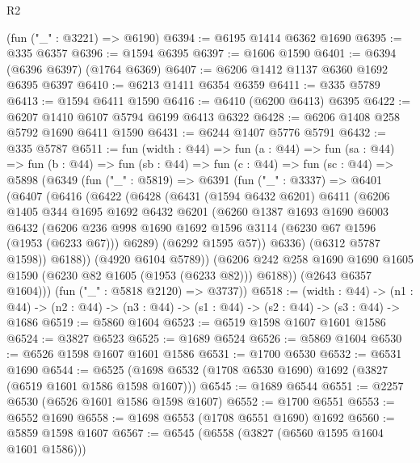 \begin{lexlean}{R2}
\begin{coremodule}
    (fun ("_" : @3221) => @6190)
@6394 := @6195 @1414 @6362 @1690
@6395 := @335 @6357
@6396 := @1594 @6395
@6397 := @1606 @1590
@6401 := @6394 (@6396 @6397) (@1764 @6369)
@6407 := @6206 @1412 @1137 @6360 @1692 @6395 @6397
@6410 := @6213 @1411 @6354 @6359
@6411 := @335 @5789
@6413 := @1594 @6411 @1590
@6416 := @6410 (@6200 @6413) @6395
@6422 := @6207 @1410 @6107 @5794 @6199 @6413 @6322
@6428 := @6206 @1408 @258 @5792 @1690 @6411 @1590
@6431 := @6244 @1407 @5776 @5791
@6432 := @335 @5787
@6511 := fun (width : @44) =>
  fun (a : @44) =>
  fun (sa : @44) =>
  fun (b : @44) =>
  fun (sb : @44) =>
  fun (c : @44) =>
  fun (sc : @44) =>
  @5898
    (@6349
      (fun ("_" : @5819) =>
      @6391
        (fun ("_" : @3337) =>
        @6401
          (@6407
            (@6416
              (@6422
                (@6428
                  (@6431
                    (@1594 @6432 @6201)
                    @6411
                    (@6206
                      @1405
                      @344
                      @1695
                      @1692
                      @6432
                      @6201
                      (@6260
                        @1387
                        @1693
                        @1690
                        @6003
                        @6432
                        (@6206
                          @236
                          @998
                          @1690
                          @1692
                          @1596
                          @3114
                          (@6230 @67 @1596 (@1953 (@6233 @67)))
                          @6289)
                        (@6292 @1595 @57))
                      @6336)
                    (@6312 @5787 @1598))
                  @6188))
              (@4920 @6104 @5789))
            (@6206 @242 @258 @1690 @1690 @1605 @1590 (@6230 @82 @1605 (@1953 (@6233 @82))) @6188))
          (@2643 @6357 @1604)))
      (fun ("_" : @5818 @2120) => @3737))
@6518 := (width : @44) ->
  (n1 : @44) -> (n2 : @44) -> (n3 : @44) -> (s1 : @44) -> (s2 : @44) -> (s3 : @44) -> @1686
@6519 := @5860 @1604
@6523 := @6519 @1598 @1607 @1601 @1586
@6524 := @3827 @6523
@6525 := @1689 @6524
@6526 := @5869 @1604
@6530 := @6526 @1598 @1607 @1601 @1586
@6531 := @1700 @6530
@6532 := @6531 @1690
@6544 := @6525 (@1698 @6532 (@1708 @6530 @1690) @1692 (@3827 (@6519 @1601 @1586 @1598 @1607)))
@6545 := @1689 @6544
@6551 := @2257 @6530 (@6526 @1601 @1586 @1598 @1607)
@6552 := @1700 @6551
@6553 := @6552 @1690
@6558 := @1698 @6553 (@1708 @6551 @1690) @1692
@6560 := @5859 @1598 @1607
@6567 := @6545 (@6558 (@3827 (@6560 @1595 @1604 @1601 @1586)))

\end{coremodule}
\end{lexlean}
